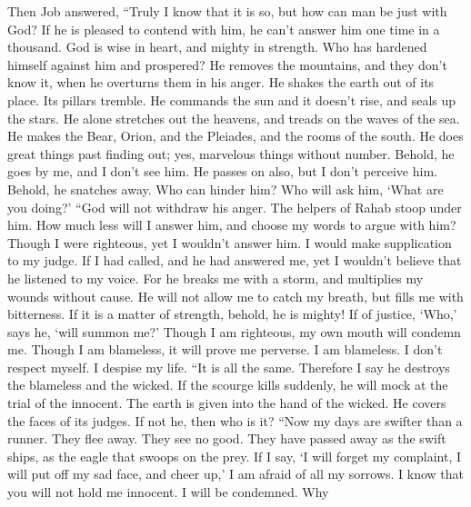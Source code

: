  Then Job answered,  ``Truly I know that it
is so, but how can man be just with God?  If he is pleased
to contend with him, he can't answer him one time in a thousand.
 God is wise in heart, and mighty in strength. Who has
hardened himself against him and prospered?  He removes
the mountains, and they don't know it, when he overturns them in his
anger.  He shakes the earth out of its place. Its pillars
tremble.  He commands the sun and it doesn't rise, and
seals up the stars.  He alone stretches out the heavens,
and treads on the waves of the sea.  He makes the Bear,
Orion, and the Pleiades, and the rooms of the south.  He
does great things past finding out; yes, marvelous things without
number.  Behold, he goes by me, and I don't see him. He
passes on also, but I don't perceive him.  Behold, he
snatches away. Who can hinder him? Who will ask him, `What are you
doing?'  ``God will not withdraw his anger. The helpers
of Rahab stoop under him.  How much less will I answer
him, and choose my words to argue with him?  Though I
were righteous, yet I wouldn't answer him. I would make supplication to
my judge.  If I had called, and he had answered me, yet I
wouldn't believe that he listened to my voice.  For he
breaks me with a storm, and multiplies my wounds without cause.
 He will not allow me to catch my breath, but fills me
with bitterness.  If it is a matter of strength, behold,
he is mighty! If of justice, `Who,' says he, `will summon me?'
 Though I am righteous, my own mouth will condemn me.
Though I am blameless, it will prove me perverse.  I am
blameless. I don't respect myself. I despise my life. 
``It is all the same. Therefore I say he destroys the blameless and the
wicked.  If the scourge kills suddenly, he will mock at
the trial of the innocent.  The earth is given into the
hand of the wicked. He covers the faces of its judges. If not he, then
who is it?  ``Now my days are swifter than a runner. They
flee away. They see no good.  They have passed away as
the swift ships, as the eagle that swoops on the prey. 
If I say, `I will forget my complaint, I will put off my sad face, and
cheer up,'  I am afraid of all my sorrows. I know that
you will not hold me innocent.  I will be condemned. Why
